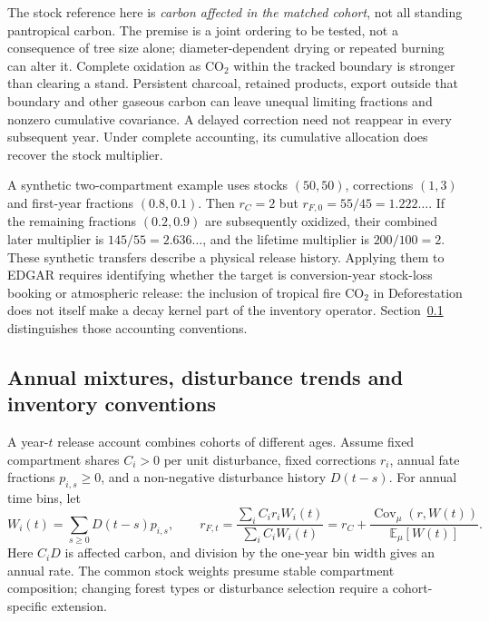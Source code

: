 \documentclass[11pt,a4paper]{article}
\newcommand{\COtwo}{\ensuremath{\mathrm{CO}_2}}
\newcommand{\E}{\mathbb{E}}
\DeclareMathOperator{\Cov}{Cov}
\theoremstyle{remark}
\begin{document}
The stock reference here is \emph{carbon affected in the matched cohort}, not all standing pantropical carbon. The premise is a joint ordering to be tested, not a consequence of tree size alone; diameter-dependent drying or repeated burning can alter it. Complete oxidation as \COtwo{} within the tracked boundary is stronger than clearing a stand. Persistent charcoal, retained products, export outside that boundary and other gaseous carbon can leave unequal limiting fractions and nonzero cumulative covariance. A delayed correction need not reappear in every subsequent year. Under complete accounting, its cumulative allocation does recover the stock multiplier.

A synthetic two-compartment example uses stocks $(50,50)$, corrections $(1,3)$ and first-year fractions $(0.8,0.1)$. Then $r_C=2$ but $r_{F,0}=55/45=1.222\ldots$. If the remaining fractions $(0.2,0.9)$ are subsequently oxidized, their combined later multiplier is $145/55=2.636\ldots$, and the lifetime multiplier is $200/100=2$. These synthetic transfers describe a physical release history. Applying them to EDGAR requires identifying whether the target is conversion-year stock-loss booking or atmospheric release: the inclusion of tropical fire \COtwo{} in Deforestation does not itself make a decay kernel part of the inventory operator. Section~\ref{sec:annual} distinguishes those accounting conventions.

\subsection{Annual mixtures, disturbance trends and inventory conventions}\label{sec:annual}
A year-$t$ release account combines cohorts of different ages. Assume fixed compartment shares $C_i>0$ per unit disturbance, fixed corrections $r_i$, annual fate fractions $p_{i,s}\geq0$, and a non-negative disturbance history $D(t-s)$. For annual time bins, let
\begin{equation}
 W_i(t)=\sum_{s\geq0}D(t-s)p_{i,s},\qquad
 r_{F,t}=\frac{\sum_i C_i r_iW_i(t)}{\sum_i C_iW_i(t)}
 =r_C+\frac{\Cov_\mu(r,W(t))}{\E_\mu[W(t)]}.
 \label{eq:annualcohorts}
\end{equation}
Here $C_iD$ is affected carbon, and division by the one-year bin width gives an annual rate. The common stock weights presume stable compartment composition; changing forest types or disturbance selection require a cohort-specific extension.
\end{document}
